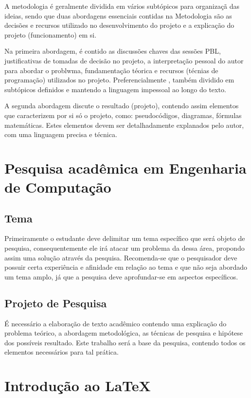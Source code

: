 \documentclass[12pt]{article}
\begin{document}
A metodologia é geralmente dividida em vários subtópicos para organizaçã  das ideias, sendo que duas abordagens essenciais contidas
na Metodologia são as decisões e recursos utilizado no desenvolvimento do projeto e a explicação do projeto (funcionamento) em si.

Na primeira abordagem, é contido as discussões chaves das sessões PBL, justificativas de tomadas de decisão no projeto, a interpretação pessoal do autor para abordar o problwma, fundamentação téorica e recursos (técnias de programação) utilizados no projeto. Preferencialmente
, também dividido em subtópicos definidos e mantendo a linguagem impessoal ao longo do texto.

A segunda abordagem discute o resultado (projeto), contendo assim elementos que caracterizem por si só o projeto, como: pseudocódigos, diagramas, fórmulas matemáticas. Estes elementos devem ser detalhadamente explanados pelo autor, com uma linguagem precisa e técnica.   

\section{Pesquisa acadêmica em Engenharia de Computação}

\subsection{Tema}

Primeiramente o estudante deve delimitar um tema específico que será objeto de pesquisa, consequentemente ele irá atacar um problema da dessa área, propondo
assim uma solução através da pesquisa. Recomenda-se que o pesquisador deve possuir certa experiência e afinidade em relação ao tema e que não seja abordado um tema amplo, já que a pesquisa deve aprofundar-se em aspectos específicos.

\subsection{Projeto de Pesquisa}

É necessário a elaboração de texto acadêmico contendo uma explicação do problema teórico, a abordagem metodológica, as técnicas de pesquisa e hipótese dos possíveis resultado. Este trabalho será a base da pesquisa, contendo todos os elementos necessários para tal prática. 

\section{Introdução ao \LaTeX}
\end{document}
